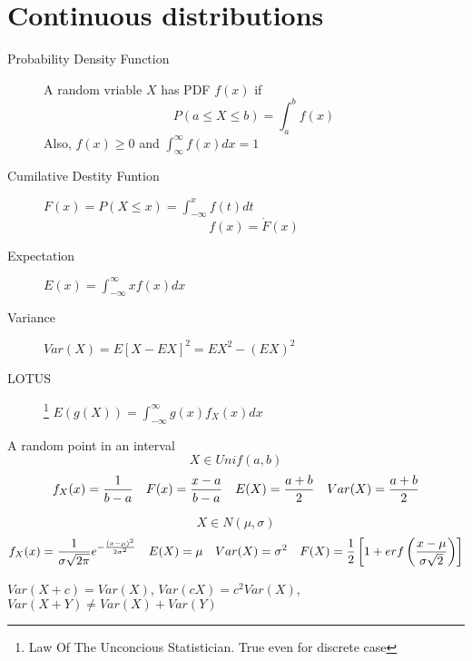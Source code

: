 \section{Continuous distributions}

\begin{slide}
\begin{description}
\item[Probability Density Function]
A random vriable $X$ has PDF $f(x)$ if $$P(a\leq X \leq b) = \int_a^bf(x)$$ Also, $f(x)\geq 0$ and $\int_{\infty}^\infty f(x)dx = 1$ 
\item[Cumilative Destity Funtion]
$F(x) = P(X\leq x) = \int_{-\infty}^xf(t)dt$
$$f(x) = \dot{F}(x)$$
\item[Expectation] $E(x) = \int_{-\infty}^\infty xf(x)dx$
\item[Variance] $Var(X) = E[X - EX]^2 = EX^2 - (EX)^2$
\item[LOTUS]\footnote[3]{Law Of The Unconcious Statistician. True even for discrete case} $E(g(X)) = \int_{-\infty}^\infty g(x)f_X(x)dx$
\end{description}

\end{slide}

\begin{slide}
\begin{shaded}
{\noindent
    A random point in an interval
}
    $$X \in Unif(a,b)$$
    $$
    f_X(x) = {1\over b-a}  
    \quad 
    F(x)   = {x-a \over b-a}
    \quad
    E(X)   = {a+b \over 2} 
    \quad
    Var(X) = {a+b \over 2} 
    $$
\end{shaded}


\end{slide}

\begin{slide} 
  \begin{shaded}
    $$X \in N(\mu,\sigma)$$
    $$
    f_X(x) = {1\over \sigma \sqrt{2\pi}} e^{-{(x-\mu)^2 \over 2\sigma^2}} 
    \quad
    E(X)   = \mu
    \quad
    Var(X) =\sigma^2
    \quad 
    F(X)   = {1\over 2}\left[1+erf\left({x-\mu \over \sigma\sqrt{2}}\right)\right]
    $$
  \end{shaded}

$Var(X+c) = Var(X)$, $Var(cX) = c^2Var(X)$, $Var(X+Y) \neq Var(X) + Var(Y)$

\end{slide}


